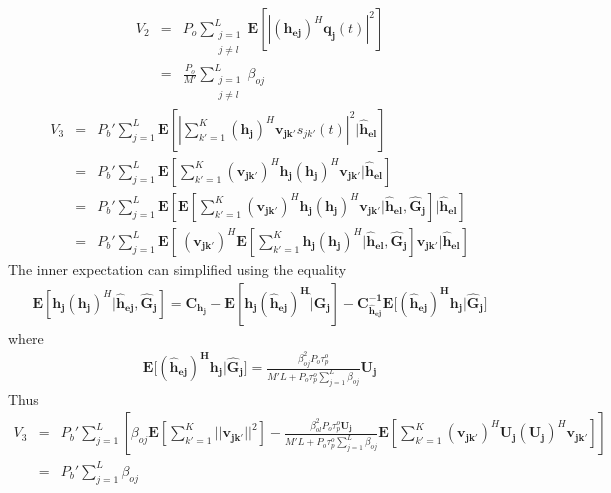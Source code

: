 \documentclass[10pt, a4paper, twoside,fleqn]{article}
\begin{document}
\begin{eqnarray}\label{eqn:otv2}
	V_2 &=& P_o \sum_{\substack{j=1 \\ j \neq l}}^{L} \mathbf{E}[|(\mathbf{h_{ej}})^H\mathbf{q_j}(t)|^2] \nonumber \\
            &=& \frac{P_o}{M'} \sum_{\substack{j=1 \\ j\neq l}}^{L} \beta_{oj}
\end{eqnarray}
\begin{eqnarray}
	V_3 &=& P_b' \sum_{j=1}^{L} \mathbf{E}\left[\left|\sum_{k'=1}^{K} (\mathbf{h_j})^H \mathbf{v_{jk'}}s_{jk'}(t) \right|^2 | \mathbf{\hat h_{el}} \right] \nonumber \\
            &=& P_b' \sum_{j=1}^{L} \mathbf{E}\left[\sum_{k'=1}^{K} (\mathbf{v_{jk'}})^H \mathbf{h_j}  (\mathbf{h_j})^H \mathbf{v_{jk'}}| \mathbf{\hat h_{el}} \right] \nonumber \\
            &=& P_b' \sum_{j=1}^{L} \mathbf{E}\left[\mathbf{E}\left[\sum_{k'=1}^{K} (\mathbf{v_{jk'}})^H \mathbf{h_j}  (\mathbf{h_j})^H \mathbf{v_{jk'}}| \mathbf{\hat h_{el}},  \mathbf{\hat G_{j}} \right] | \mathbf{\hat h_{el}}\right] \nonumber \\
            &=& P_b' \sum_{j=1}^{L} \mathbf{E}\left[\ (\mathbf{v_{jk'}})^H \mathbf{E}\left[\sum_{k'=1}^{K} \mathbf{h_j}  (\mathbf{h_j})^H | \mathbf{\hat h_{el}},  \mathbf{\hat G_{j}} \right] \mathbf{v_{jk'}}| \mathbf{\hat h_{el}}\right]
\end{eqnarray}
The inner expectation can simplified using the equality \cite{bib:rmtBook}
\begin{eqnarray}
	\mathbf{E}[\mathbf{h_j}(\mathbf{h_j})^H|\mathbf{\hat h_{ej}}, \mathbf{\hat G_{j}}] = \mathbf{C_{h_j}}-\mathbf{E[h_j (\hat h_{ej})^H \hat| G_{j}] - C_{\hat h_{ej}}^{-1}E[(\hat h_{ej})^H h_j| \hat G_{j}}]
\end{eqnarray}
where
\begin{eqnarray}
	\mathbf{E[(\hat h_{ej})^H h_j| \hat G_{j}}] = \frac{\beta_{oj}^{2}P_o\tau_p^o}{M'L+P_o\tau_p^o\sum\limits_{j=1}^{L}\beta_{oj}}\mathbf{U_j}
\end{eqnarray}
Thus
\begin{eqnarray}\label{eqn:otv3}
	V_3 &=& P_b' \sum_{j=1}^{L} \left[ \beta_{oj} \mathbf{E}[\sum_{k'=1}^{K}||\mathbf{v_{jk'}}||^2]
					- \frac{\beta_{ol}^{2}P_o\tau_p^o\mathbf{U_j}}{M'L+P_o\tau_p^o\sum\limits_{j=1}^{L}\beta_{oj}} \mathbf{E}\left[\sum_{k'=1}^{K} (\mathbf{v_{jk'}})^H \mathbf{U_j}  (\mathbf{U_j})^H \mathbf{v_{jk'}}\right]\right] \nonumber \\
	    &=& P_b'\sum_{j=1}^{L}\beta_{oj}
\end{eqnarray}
\end{document}
